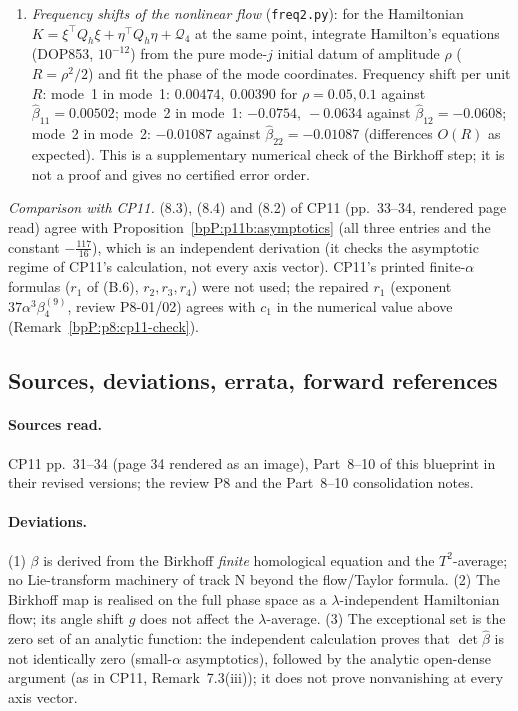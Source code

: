 \begin{enumerate}
\item \emph{Frequency shifts of the nonlinear flow} (\texttt{freq2.py}): for the Hamiltonian $K=\xi^\top Q_h\xi+\eta^\top Q_h\eta+\mathcal Q_4$ at the same point, integrate Hamilton's equations (DOP853, $10^{-12}$) from the pure mode-$j$ initial datum of amplitude $\rho$ ($R=\rho^2/2$) and fit the phase of the mode coordinates. Frequency shift per unit $R$: mode~1 in mode~1: $0.00474,\ 0.00390$ for $\rho=0.05,0.1$ against $\hat\beta_{11}=0.00502$; mode~2 in mode~1: $-0.0754,\ -0.0634$ against $\hat\beta_{12}=-0.0608$; mode~2 in mode~2: $-0.01087$ against $\hat\beta_{22}=-0.01087$ (differences $O(R)$ as expected). This is a supplementary numerical check of the Birkhoff step; it is not a proof and gives no certified error order.
\end{enumerate}
\emph{Comparison with CP11.} (8.3), (8.4) and (8.2) of CP11 (pp.~33--34, rendered page read) agree with Proposition~\ref{bpP:p11b:asymptotics} (all three entries and the constant $-\frac{117}{16}$), which is an independent derivation (it checks the asymptotic regime of CP11's calculation, not every axis vector). CP11's printed finite-$\alpha$ formulas ($r_1$ of (B.6), $r_2,r_3,r_4$) were not used; the repaired $r_1$ (exponent $37\alpha^3\beta_4^{(9)}$, review P8-01/02) agrees with $c_1$ in the numerical value above (Remark~\ref{bpP:p8:cp11-check}).

\subsection{Sources, deviations, errata, forward references}\label{bpP:p11b:notes}

\paragraph{Sources read.} CP11 pp.~31--34 (page 34 rendered as an image), Part~8--10 of this blueprint in their revised versions; the review P8 and the Part~8--10 consolidation notes.

\paragraph{Deviations.} (1) $\beta$ is derived from the Birkhoff \emph{finite} homological equation and the $T^2$-average; no Lie-transform machinery of track N beyond the flow/Taylor formula. (2) The Birkhoff map is realised on the full phase space as a $\lambda$-independent Hamiltonian flow; its angle shift $g$ does not affect the $\lambda$-average. (3) The exceptional set is the zero set of an analytic function: the independent calculation proves that $\det\hat\beta$ is not identically zero (small-$\alpha$ asymptotics), followed by the analytic open-dense argument (as in CP11, Remark~7.3(iii)); it does not prove nonvanishing at every axis vector.

